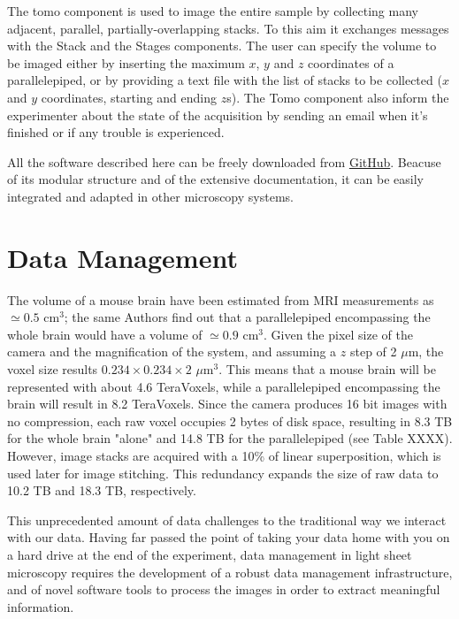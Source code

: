\documentclass[12pt]{spieman}  %
\begin{document}
The tomo component is used to image the entire sample by collecting many adjacent, parallel, partially-overlapping stacks. To this aim it exchanges messages with the Stack and the Stages components. The user can specify the volume to be imaged either by inserting the maximum $x$, $y$ and $z$ coordinates of a parallelepiped, or by providing a text file with the list of stacks to be collected ($x$ and $y$ coordinates, starting and ending $z$s). The Tomo component also inform the experimenter about the state of the acquisition by sending an email when it's finished or if any trouble is experienced.

All the software described here can be freely downloaded from \href{https://github.com/marcelvanthoff/Giorgio}{GitHub}. Beacuse of its modular structure and of the extensive documentation, it can be easily integrated and adapted in other microscopy systems.

\section{Data Management}

The volume of a mouse brain have been estimated from MRI measurements \cite{Kovacevic2005} as $\simeq 0.5$ $\text{cm}^3$; the same Authors find out that a parallelepiped encompassing the whole brain would have a volume of $\simeq 0.9$ $\text{cm}^3$. Given the pixel size of the camera and the magnification of the system, and assuming a $z$ step of 2 $\mu$m, the voxel size results $0.234\times0.234\times2$ $\mu\text{m}^3$. This means that a mouse brain will be represented with about 4.6 TeraVoxels, while a parallelepiped encompassing the brain will result in 8.2 TeraVoxels. Since the camera produces 16 bit images with no compression, each raw voxel occupies 2 bytes of disk space, resulting in 8.3 TB for the whole brain "alone" and 14.8 TB for the parallelepiped (see Table XXXX). However, image stacks are acquired with a 10\% of linear superposition, which is used later for image stitching. This redundancy expands the size of raw data to 10.2 TB and 18.3 TB, respectively.

This unprecedented amount of data challenges to the traditional way we interact with our data. Having far passed the point of taking your data home with you on a hard drive at the end of the experiment, data management in light sheet microscopy requires the development of a robust data management infrastructure, and of novel software tools to process the images in order to extract meaningful information.
\end{document}
